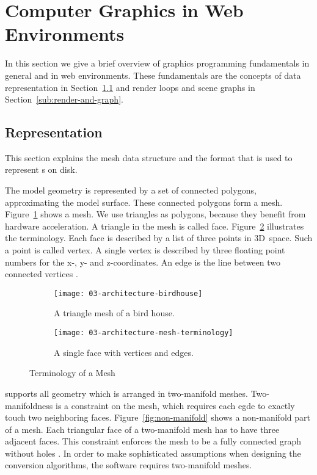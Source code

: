 \documentclass[../../ClassicThesis.tex]{subfiles}
\begin{document}
\section{Computer Graphics in Web Environments}
\label{sec:cg-web}

In this section we give a brief overview of graphics programming
fundamentals in general and in web environments. These fundamentals
are the concepts of {\threedmodel} data representation in
Section~\ref{sub:model-representation} and render loops and scene
graphs in Section~\ref{sub:render-and-graph}.

\subsection{{\threedmodel} Representation}
\label{sub:model-representation}

This section explains the mesh data structure and the {\stlfile}
format that is used to represent {\threedmodel}s on disk.

The model geometry is represented by a set of connected
polygons, approximating the model surface. These connected
polygons form a mesh. Figure~\ref{fig:term-mesh:mesh} shows
a mesh. We use triangles as polygons, because they
benefit from hardware acceleration. A triangle in the mesh
is called face. Figure~\ref{fig:term-mesh:face} illustrates
the terminology. Each face is described by a list of three
points in 3D~space. Such a point is called vertex. A single
vertex is described by three floating point numbers for the
x-, y- and z-coordinates. An edge is the line between two
connected vertices \cite[p.~3]{intro-cg}.

\begin{figure}[h]
  \centering
  \begin{subfigure}[b]{0.49\textwidth}
    \centering
    \texttt{[image: 03-architecture-birdhouse]}
    \caption{A triangle mesh of a bird house.}
    \label{fig:term-mesh:mesh}
  \end{subfigure}
  \begin{subfigure}[b]{0.49\textwidth}
    \centering
    \texttt{[image: 03-architecture-mesh-terminology]}
    \caption{A single face with vertices and edges.}
    \label{fig:term-mesh:face}
  \end{subfigure}
  \caption{Terminology of a Mesh}
  \label{fig:term-mesh}
\end{figure}

{\platener} supports all geometry which is arranged in two-manifold
meshes. Two-manifoldness is a constraint on the mesh, which requires
each egde to exactly touch two neighboring faces.
Figure~\ref{fig:non-manifold} shows a non-manifold part of a mesh.
Each triangular face of a two-manifold mesh has to have three adjacent
faces. This constraint enforces the mesh to be a fully connected graph
without holes \cite[p.~28]{master-thesis}. In order to make
sophisticated assumptions when designing the conversion algorithms,
the software requires two-manifold meshes.
\end{document}
